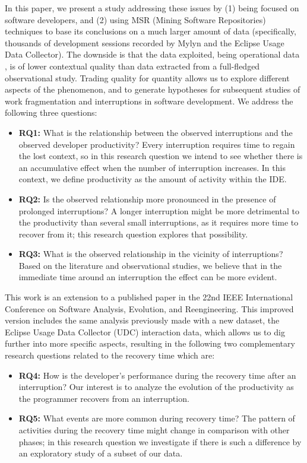 \documentclass[times]{smrauth}
\begin{document}
In this paper, we present a study addressing these issues by (1) being focused on software developers, and (2) using MSR (Mining Software Repositories) techniques to base its conclusions on a much larger amount of data (specifically, thousands of development sessions recorded by Mylyn and the Eclipse Usage Data Collector). The downside is that the data exploited, being operational data \cite{M14}, is of lower contextual quality than data extracted from a full-fledged observational study. Trading quality for quantity allows us to explore different aspects of the phenomenon, and to generate hypotheses for subsequent studies of work fragmentation and interruptions in software development. We address the following three questions:
\begin{itemize}
\item \textbf{RQ1:} What is the relationship between the observed interruptions and the observed developer productivity? Every interruption requires time to regain the lost context, so in this research question we intend to see whether there is an accumulative effect when the number of interruption increases. In this context, we define productivity as the amount of activity within the IDE. 
\item \textbf{RQ2:} Is the observed relationship more pronounced in the presence of prolonged interruptions? A longer interruption might be more detrimental to the productivity than several small interruptions, as it requires more time to recover from it; this research question explores that possibility.
\item \textbf{RQ3:}  What is the observed relationship in the vicinity of interruptions? Based on the literature and observational studies, we believe that in the immediate time around an interruption the effect can be more evident.
\end{itemize}

This work is an extension to a published paper in the 22nd IEEE International Conference on Software Analysis, Evolution, and Reengineering. This improved version includes the same analysis previously made with a new dataset, the Eclipse Usage Data Collector (UDC) interaction data, which allows us to dig further into more specific aspects, resulting in the following two complementary research questions related to the recovery time which are:
\begin{itemize}
\item \textbf{RQ4:} How is the developer's performance during the recovery time after an interruption? Our interest is to analyze the evolution of the productivity as the programmer recovers from an interruption.
\item \textbf{RQ5:} What events are more common during recovery time? The pattern of activities during the recovery time might change in comparison with other phases; in this research question we investigate if there is such a difference by an exploratory study of a subset of our data. 
\end{itemize}
\end{document}
